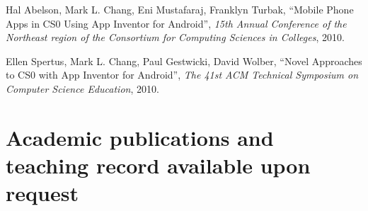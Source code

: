 \documentclass[line]{res}
\begin{document}
\begin{resume}
	Hal Abelson, Mark L. Chang, Eni Mustafaraj, Franklyn Turbak, ``Mobile Phone Apps in CS0 Using App Inventor for Android'', \textit{15th Annual Conference of the Northeast region of the Consortium for Computing Sciences in Colleges}, 2010.
	
	Ellen Spertus, Mark L. Chang, Paul Gestwicki, David Wolber, ``Novel Approaches to CS0 with App Inventor for Android'', \textit{The 41st ACM Technical Symposium on Computer Science Education}, 2010.
	
	\section{\sc Academic publications and teaching record available upon request}


	
\end{resume}
\end{document}
